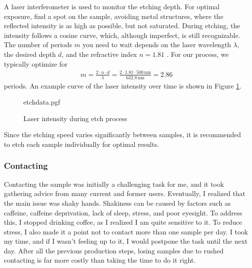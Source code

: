         A laser interferometer is used to monitor the etching depth. For optimal exposure, find a spot on the sample, avoiding metal structures, where the reflected intensity is as high as possible, but not saturated. During etching, the intensity follows a cosine curve, which, although imperfect, is still recognizable. The number of periods $m$ you need to wait depends on the laser wavelength $\lambda$, the desired depth $d$, and the refractive index $n=1.81$ \cite{noauthor_duramide-100_2012}. For our process, we typically optimize for 
        \begin{align}
            m = \frac{2 \cdot n \cdot d}{\lambda} = \frac{2 \cdot 1.81 \cdot 500\,\mathrm{nm}}{632.8\,\mathrm{nm}} = 2.86
        \end{align}
        periods. An example curve of the laser intensity over time is shown in Figure \ref{fig:methods:rie}.

        \begin{figure}
            \centering
            {etchdata.pgf}
            \caption{Laser intensity during etch process}
            \label{fig:methods:rie}
        \end{figure}
        
        Since the etching speed varies significantly between samples, it is recommended to etch each sample individually for optimal results. 



    \subsubsection*{Contacting}

        Contacting the sample was initially a challenging task for me, and it took gathering advice from many current and former users. Eventually, I realized that the main issue was shaky hands. Shakiness can be caused by factors such as caffeine, caffeine deprivation, lack of sleep, stress, and poor eyesight. To address this, I stopped drinking coffee, as I realized I am quite sensitive to it. To reduce stress, I also made it a point not to contact more than one sample per day. I took my time, and if I wasn't feeling up to it, I would postpone the task until the next day. After all the previous production steps, losing samples due to rushed contacting is far more costly than taking the time to do it right.

